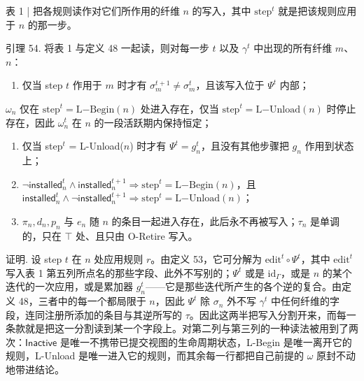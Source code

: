 表 1 | 把各规则读作对它们所作用的纤维 $n$ 的写入，其中 $\mathrm{step}^{t}$ 就是把该规则应用于 $n$ 的那一步。

引理 54. 将表 1 与定义 48 一起读，则对每一步 $t$ 以及 $\gamma ^ { t }$ 中出现的所有纤维 $m$、$n$：

\begin{enumerate}
\def\labelenumi{\arabic{enumi}.}
\tightlist
\item
  仅当 step $t$ 作用于 $m$ 时才有 $\sigma _ { m } ^ { t + 1 } \neq \sigma _ { m } ^ { t }$，且该写入位于 $\Psi ^ { t }$ 内部；
\end{enumerate}

$\omega _ { n }$ 仅在 $\mathrm { s t e p } ^ { t } = \mathrm { L } \mathrm { - B e g i n } ( n )$ 处进入存在，仅当 $\mathrm { s t e p } ^ { t } = \mathrm { L } \mathrm { - U n l o a d } ( n )$ 时停止存在，因此 $\omega _ { n } ^ { t }$ 在 $n$ 的一段活跃期内保持恒定；

\begin{enumerate}
\def\labelenumi{\arabic{enumi}.}
\setcounter{enumi}{2}
\item
  仅当 step$^t$ = L-Unload($n$) 时才有 $\Psi ^ { t } = g _ { n } ^ { t }$，且没有其他步骤把 $g _ { n }$ 作用到状态上；
\item
  $\neg \mathsf{installed}_{n}^{t} \wedge \mathsf{installed}_{n}^{t + 1} \Rightarrow \mathrm { s t e p } ^ { t } = \mathrm { L } \mathrm { - B e g i n } ( n )$，且 $\mathsf{installed}_{n}^{t} \wedge \neg \mathsf{installed}_{n}^{t + 1} \Rightarrow \mathrm { s t e p } ^ { t } = \mathrm { L } \mathrm { - U n l o a d } ( n )$；
\item
  $\pi _ { n } , d _ { n } , p _ { n }$ 与 $e _ { n }$ 随 $n$ 的条目一起进入存在，此后永不再被写入；$\tau _ { n }$ 是单调的，只在 $\top$ 处、且只由 O-Retire 写入。
\end{enumerate}

证明. 设 step $t$ 在 $n$ 处应用规则 $r$。由定义 53，它可分解为 $\mathrm{edit}^{t} \circ \Psi ^ { t }$，其中 $\mathrm{edit}^{t}$ 写入表 1 第五列所点名的那些字段、此外不写别的；$\Psi ^ { t }$ 或是 $\mathrm { i d } _ { \Gamma }$，或是 $n$ 的某个迭代的一次应用，或是累加器 $g _ { n } ^ { t }$——它是那些迭代所产生的各个逆的复合。由定义 48，三者中的每一个都局限于 $n$，因此 $\Psi ^ { t }$ 除 $\sigma _ { n }$ 外不写 $\gamma ^ { t }$ 中任何纤维的字段，连同注册所添加的条目与其逆所写的 $\tau$。因此这两半把写入分割开来，而每一条款就是把这一分割读到某一个字段上。对第二列与第三列的一种读法被用到了两次：$\mathsf{Inactive}$ 是唯一不携带已提交视图的生命周期状态，L-Begin 是唯一离开它的规则，L-Unload 是唯一进入它的规则，而其余每一行都把自己前提的 $\omega$ 原封不动地带进结论。

